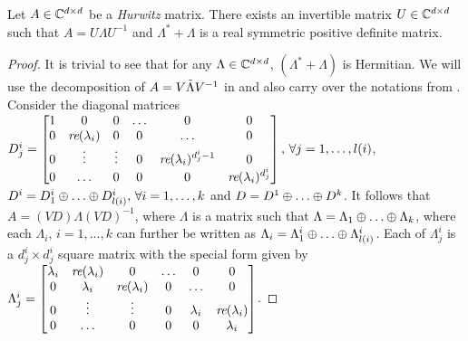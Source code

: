 \begin{lemma}\label{lm:simtran}
Let $A\in \mathbb{C}^{d \times d}$ be a \emph{Hurwitz} matrix. There exists an invertible matrix $U\in \mathbb{C}^{d \times d}$ such that $A=U\Lambda U^{-1}$ and $\Lambda^*+\Lambda$ is a real symmetric positive definite matrix.
\end{lemma}
\begin{proof}
It is trivial to see that for any $\Lambda\in \mathbb{C}^{d \times d}$, $\left(\Lambda^*+\Lambda\right)$ is Hermitian. We will use the decomposition of $A=V \tilde{\Lambda} V^{-1}$ in  and also carry over the notations from . Consider the diagonal matrices $D^i_j=\begin{bmatrix} 1  &0 &0 &\ldots &0 &0\\ 0 &\emph{re}(\lambda_i) &0 &0 &\ldots &0 \\ 0 &\vdots &\vdots &0 &\emph{re}(\lambda_i)^{d^i_j-1} &0 \\ 0 &\ldots &0 &0 &0 &\emph{re}(\lambda_i)^{d^i_j} \end{bmatrix},\,\forall j=1,\ldots,l(i)$, $D^i=D^i_1 \oplus\ldots\oplus D^i_{l(i)},\,\forall i=1,\ldots,k$ and $D=D^1 \oplus\ldots\oplus D^k$.
It follows that $A=(VD) \Lambda (VD)^{-1}$, where $\Lambda$ is a matrix such that
$\Lambda=\Lambda_1 \oplus \ldots \oplus \Lambda_k$, where each $\Lambda_i,\,i=1,\ldots,k$ can further be written as
$\Lambda_i=\Lambda^i_{1} \oplus \ldots \oplus \Lambda^i_{{l(i)}}$. Each of $\Lambda^i_{j}$ is a $d^i_j\times d^i_j$ square matrix with the special form given by
$\Lambda^i_{j}=\begin{bmatrix} \lambda_i &\emph{re}(\lambda_i) &0 &\ldots &0 &0\\ 0 &\lambda_i &\emph{re}(\lambda_i) &0 &\ldots &0 \\ 0 &\vdots &\vdots &0 &\lambda_i &\emph{re}(\lambda_i) \\ 0 &\ldots &0 &0 &0 &\lambda_i \end{bmatrix}$.


\end{proof}
